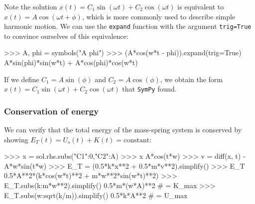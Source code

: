 \noindent
Note the solution $x(t)=C_1\sin(\omega t)+C_2 \cos(\omega t)$ is equivalent to $x(t) = A\cos(\omega t + \phi)$, 
which is more commonly used to describe simple harmonic motion. 
We can use the \texttt{expand} function with the argument \texttt{trig=True} to convince ourselves of this equivalence:

\small
\begin{verbatimtab}
>>> A, phi = symbols("A phi")
>>> (A*cos(w*t - phi)).expand(trig=True)
A*sin(phi)*sin(w*t) + A*cos(phi)*cos(w*t)
\end{verbatimtab}
\normalsize

\noindent
If we define $C_1=A\sin(\phi)$ and $C_2=A\cos(\phi)$, 
we obtain the form $x(t)=C_1\sin(\omega t)+C_2 \cos(\omega t)$ that \texttt{SymPy} found.


\subsubsection{Conservation of energy}

We can verify that the total energy of the mass-spring system is conserved by showing $E_T(t) = U_s(t) + K(t) = \textrm{constant}$: 

\small
\begin{verbatimtab}
>>> x = sol.rhs.subs({"C1":0,"C2":A}) 
>>> x
A*cos(t*w)
>>> v = diff(x, t)
-A*w*sin(t*w)
>>> E_T = (0.5*k*x**2 + 0.5*m*v**2).simplify()
>>> E_T
0.5*A**2*(k*cos(w*t)**2 + m*w**2*sin(w*t)**2)
>>> E_T.subs({k:m*w**2}).simplify()
0.5*m*(w*A)**2                            # = K_max
>>> E_T.subs({w:sqrt(k/m)}).simplify()
0.5*k*A**2                                # = U_max 
\end{verbatimtab}
\normalsize



